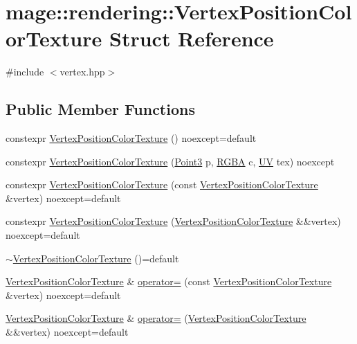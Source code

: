 \hypertarget{structmage_1_1rendering_1_1_vertex_position_color_texture}{}\section{mage\+:\+:rendering\+:\+:Vertex\+Position\+Color\+Texture Struct Reference}
\label{structmage_1_1rendering_1_1_vertex_position_color_texture}


{\ttfamily \#include $<$vertex.\+hpp$>$}

\subsection*{Public Member Functions}
\begin{DoxyCompactItemize}
\item 
constexpr \mbox{\hyperlink{structmage_1_1rendering_1_1_vertex_position_color_texture_a17b6bdad1f02adb800161f0d3b37aff6}{Vertex\+Position\+Color\+Texture}} () noexcept=default
\item 
constexpr \mbox{\hyperlink{structmage_1_1rendering_1_1_vertex_position_color_texture_a39b702f8f31cd6943e39e1f70c6e136d}{Vertex\+Position\+Color\+Texture}} (\mbox{\hyperlink{structmage_1_1_point3}{Point3}} p, \mbox{\hyperlink{structmage_1_1_r_g_b_a}{R\+G\+BA}} c, \mbox{\hyperlink{structmage_1_1_u_v}{UV}} tex) noexcept
\item 
constexpr \mbox{\hyperlink{structmage_1_1rendering_1_1_vertex_position_color_texture_a16b7e031b692acf1be28b72ef3c5ff31}{Vertex\+Position\+Color\+Texture}} (const \mbox{\hyperlink{structmage_1_1rendering_1_1_vertex_position_color_texture}{Vertex\+Position\+Color\+Texture}} \&vertex) noexcept=default
\item 
constexpr \mbox{\hyperlink{structmage_1_1rendering_1_1_vertex_position_color_texture_a7747df2151f6b904570bcdcc96898c75}{Vertex\+Position\+Color\+Texture}} (\mbox{\hyperlink{structmage_1_1rendering_1_1_vertex_position_color_texture}{Vertex\+Position\+Color\+Texture}} \&\&vertex) noexcept=default
\item 
\mbox{\hyperlink{structmage_1_1rendering_1_1_vertex_position_color_texture_a702ec0ffbe8eae3db1e8149f3124135d}{$\sim$\+Vertex\+Position\+Color\+Texture}} ()=default
\item 
\mbox{\hyperlink{structmage_1_1rendering_1_1_vertex_position_color_texture}{Vertex\+Position\+Color\+Texture}} \& \mbox{\hyperlink{structmage_1_1rendering_1_1_vertex_position_color_texture_a6581fcf8532cb638a1e3a1f2199db264}{operator=}} (const \mbox{\hyperlink{structmage_1_1rendering_1_1_vertex_position_color_texture}{Vertex\+Position\+Color\+Texture}} \&vertex) noexcept=default
\item 
\mbox{\hyperlink{structmage_1_1rendering_1_1_vertex_position_color_texture}{Vertex\+Position\+Color\+Texture}} \& \mbox{\hyperlink{structmage_1_1rendering_1_1_vertex_position_color_texture_a4c338713e4f1a1ad4d66188791bf365a}{operator=}} (\mbox{\hyperlink{structmage_1_1rendering_1_1_vertex_position_color_texture}{Vertex\+Position\+Color\+Texture}} \&\&vertex) noexcept=default
\end{DoxyCompactItemize}
